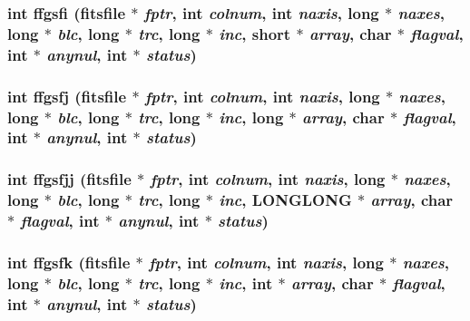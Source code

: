 \subsubsection{\setlength{\rightskip}{0pt plus 5cm}int ffgsfi (\bf{fitsfile} $\ast$ {\em fptr}, int {\em colnum}, int {\em naxis}, long $\ast$ {\em naxes}, long $\ast$ {\em blc}, long $\ast$ {\em trc}, long $\ast$ {\em inc}, short $\ast$ {\em array}, char $\ast$ {\em flagval}, int $\ast$ {\em anynul}, int $\ast$ {\em status})}\label{fitsio_8h_64fe61a10be1e4a7891e611c2367811a}


\subsubsection{\setlength{\rightskip}{0pt plus 5cm}int ffgsfj (\bf{fitsfile} $\ast$ {\em fptr}, int {\em colnum}, int {\em naxis}, long $\ast$ {\em naxes}, long $\ast$ {\em blc}, long $\ast$ {\em trc}, long $\ast$ {\em inc}, long $\ast$ {\em array}, char $\ast$ {\em flagval}, int $\ast$ {\em anynul}, int $\ast$ {\em status})}\label{fitsio_8h_5fe7f8cf0ec4c375a0d8883974df5e3f}


\subsubsection{\setlength{\rightskip}{0pt plus 5cm}int ffgsfjj (\bf{fitsfile} $\ast$ {\em fptr}, int {\em colnum}, int {\em naxis}, long $\ast$ {\em naxes}, long $\ast$ {\em blc}, long $\ast$ {\em trc}, long $\ast$ {\em inc}, \bf{LONGLONG} $\ast$ {\em array}, char $\ast$ {\em flagval}, int $\ast$ {\em anynul}, int $\ast$ {\em status})}\label{fitsio_8h_928fae8967c2f8fbbd25314487385b55}


\subsubsection{\setlength{\rightskip}{0pt plus 5cm}int ffgsfk (\bf{fitsfile} $\ast$ {\em fptr}, int {\em colnum}, int {\em naxis}, long $\ast$ {\em naxes}, long $\ast$ {\em blc}, long $\ast$ {\em trc}, long $\ast$ {\em inc}, int $\ast$ {\em array}, char $\ast$ {\em flagval}, int $\ast$ {\em anynul}, int $\ast$ {\em status})}\label{fitsio_8h_0efb49c901a562ffccd69c4c87c47387}


